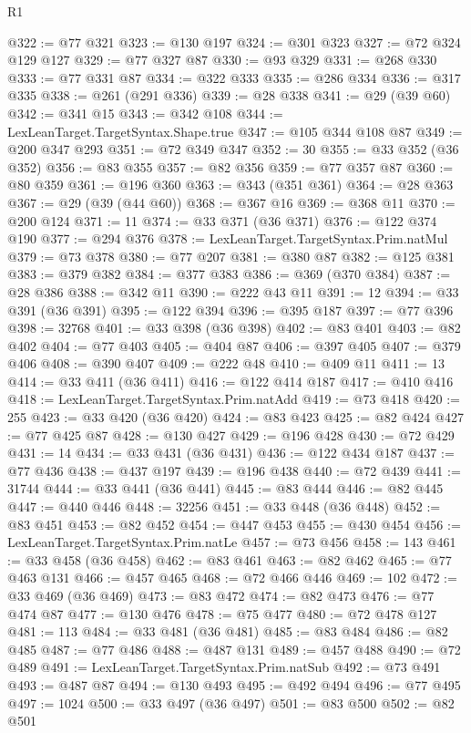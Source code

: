 \begin{lexlean}{R1}
\begin{coremodule}
@322 := @77 @321
@323 := @130 @197
@324 := @301 @323
@327 := @72 @324 @129 @127
@329 := @77 @327 @87
@330 := @93 @329
@331 := @268 @330
@333 := @77 @331 @87
@334 := @322 @333
@335 := @286 @334
@336 := @317 @335
@338 := @261 (@291 @336)
@339 := @28 @338
@341 := @29 (@39 @60)
@342 := @341 @15
@343 := @342 @108
@344 := LexLeanTarget.TargetSyntax.Shape.true
@347 := @105 @344 @108 @87
@349 := @200 @347 @293
@351 := @72 @349 @347
@352 := 30
@355 := @33 @352 (@36 @352)
@356 := @83 @355
@357 := @82 @356
@359 := @77 @357 @87
@360 := @80 @359
@361 := @196 @360
@363 := @343 (@351 @361)
@364 := @28 @363
@367 := @29 (@39 (@44 @60))
@368 := @367 @16
@369 := @368 @11
@370 := @200 @124
@371 := 11
@374 := @33 @371 (@36 @371)
@376 := @122 @374 @190
@377 := @294 @376
@378 := LexLeanTarget.TargetSyntax.Prim.natMul
@379 := @73 @378
@380 := @77 @207
@381 := @380 @87
@382 := @125 @381
@383 := @379 @382
@384 := @377 @383
@386 := @369 (@370 @384)
@387 := @28 @386
@388 := @342 @11
@390 := @222 @43 @11
@391 := 12
@394 := @33 @391 (@36 @391)
@395 := @122 @394
@396 := @395 @187
@397 := @77 @396
@398 := 32768
@401 := @33 @398 (@36 @398)
@402 := @83 @401
@403 := @82 @402
@404 := @77 @403
@405 := @404 @87
@406 := @397 @405
@407 := @379 @406
@408 := @390 @407
@409 := @222 @48
@410 := @409 @11
@411 := 13
@414 := @33 @411 (@36 @411)
@416 := @122 @414 @187
@417 := @410 @416
@418 := LexLeanTarget.TargetSyntax.Prim.natAdd
@419 := @73 @418
@420 := 255
@423 := @33 @420 (@36 @420)
@424 := @83 @423
@425 := @82 @424
@427 := @77 @425 @87
@428 := @130 @427
@429 := @196 @428
@430 := @72 @429
@431 := 14
@434 := @33 @431 (@36 @431)
@436 := @122 @434 @187
@437 := @77 @436
@438 := @437 @197
@439 := @196 @438
@440 := @72 @439
@441 := 31744
@444 := @33 @441 (@36 @441)
@445 := @83 @444
@446 := @82 @445
@447 := @440 @446
@448 := 32256
@451 := @33 @448 (@36 @448)
@452 := @83 @451
@453 := @82 @452
@454 := @447 @453
@455 := @430 @454
@456 := LexLeanTarget.TargetSyntax.Prim.natLe
@457 := @73 @456
@458 := 143
@461 := @33 @458 (@36 @458)
@462 := @83 @461
@463 := @82 @462
@465 := @77 @463 @131
@466 := @457 @465
@468 := @72 @466 @446
@469 := 102
@472 := @33 @469 (@36 @469)
@473 := @83 @472
@474 := @82 @473
@476 := @77 @474 @87
@477 := @130 @476
@478 := @75 @477
@480 := @72 @478 @127
@481 := 113
@484 := @33 @481 (@36 @481)
@485 := @83 @484
@486 := @82 @485
@487 := @77 @486
@488 := @487 @131
@489 := @457 @488
@490 := @72 @489
@491 := LexLeanTarget.TargetSyntax.Prim.natSub
@492 := @73 @491
@493 := @487 @87
@494 := @130 @493
@495 := @492 @494
@496 := @77 @495
@497 := 1024
@500 := @33 @497 (@36 @497)
@501 := @83 @500
@502 := @82 @501

\end{coremodule}
\end{lexlean}
